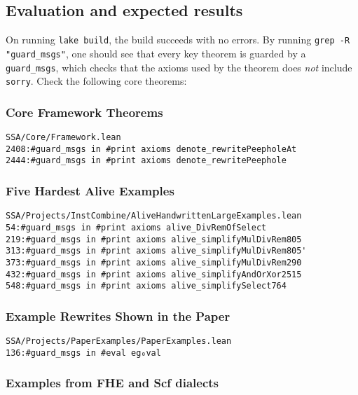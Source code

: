 \documentclass{sigplanconf}
\begin{document}
\subsection{Evaluation and expected results}

On running \texttt{lake build}, the build succeeds with no errors.
By running \texttt{grep -R "guard\_msgs"}, one should see that every key theorem 
is guarded by a \texttt{guard\_msgs}, which checks that the axioms used by the theorem does \emph{not}
include \texttt{sorry}. Check the following core theorems:

\subsubsection{Core Framework Theorems}

\begin{verbatim}
SSA/Core/Framework.lean
2408:#guard_msgs in #print axioms denote_rewritePeepholeAt
2444:#guard_msgs in #print axioms denote_rewritePeephole
\end{verbatim}

\subsubsection{Five Hardest Alive Examples}

\begin{verbatim}
SSA/Projects/InstCombine/AliveHandwrittenLargeExamples.lean
54:#guard_msgs in #print axioms alive_DivRemOfSelect
219:#guard_msgs in #print axioms alive_simplifyMulDivRem805
313:#guard_msgs in #print axioms alive_simplifyMulDivRem805'
373:#guard_msgs in #print axioms alive_simplifyMulDivRem290
432:#guard_msgs in #print axioms alive_simplifyAndOrXor2515
548:#guard_msgs in #print axioms alive_simplifySelect764
\end{verbatim}

\subsubsection{Example Rewrites Shown in the Paper}

\begin{verbatim}
SSA/Projects/PaperExamples/PaperExamples.lean
136:#guard_msgs in #eval eg₀val
\end{verbatim}

\subsubsection{Examples from FHE and Scf dialects}
\end{document}

